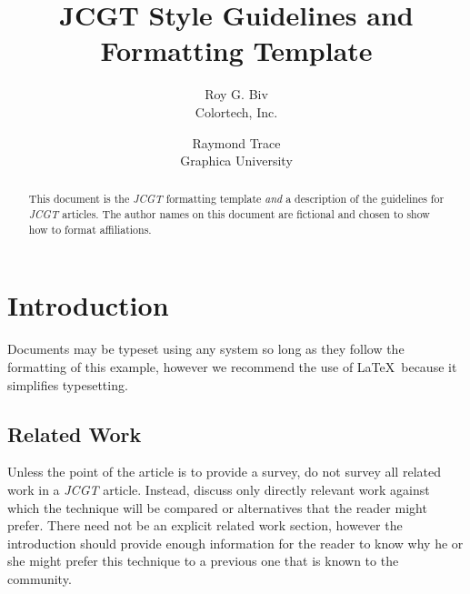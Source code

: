 \documentclass{jcgt}
\begin{document}
\title{JCGT Style Guidelines and\\Formatting Template}

\author
       {Roy G. Biv\\Colortech, Inc.
        \and Raymond Trace\\Graphica University
       }



\maketitle
\thispagestyle{firstpagestyle}

\begin{abstract}
\small
This document is the \textit{JCGT} formatting template \textit{and} a description of the guidelines
for  \textit{JCGT} articles.  The author names on this document are fictional and chosen to show
how to format affiliations.
\end{abstract}


\section{Introduction}
\label{sec:introduction}
Documents may be typeset using any system so long as they follow the formatting
of this example, however we recommend
the use of \LaTeX\ because it simplifies typesetting.

\subsection{Related Work}
\label{sec:relatedwork}

Unless the point of the article is to provide a survey, do not survey all related work in a \textit{JCGT} article. Instead, discuss only directly relevant work against which the technique will be compared or alternatives that the reader might prefer.  There need not be an explicit related work section, however the introduction should provide enough information for the reader to know why he or she might prefer this technique to a previous one that is known to the community.
\end{document}
